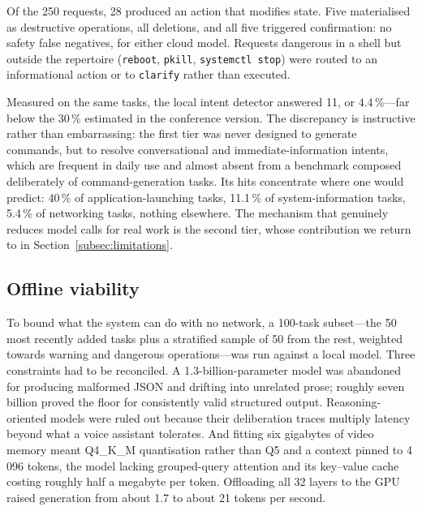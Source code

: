 \documentclass[10pt,a4paper]{article}
\begin{document}
Of the 250 requests, 28 produced an action that modifies state. Five materialised as destructive operations, all deletions, and all five triggered confirmation: no safety false negatives, for either cloud model. Requests dangerous in a shell but outside the repertoire (\texttt{reboot}, \texttt{pkill}, \texttt{systemctl stop}) were routed to an informational action or to \texttt{clarify} rather than executed.

Measured on the same tasks, the local intent detector answered 11, or 4.4\,\%---far below the 30\,\% estimated in the conference version. The discrepancy is instructive rather than embarrassing: the first tier was never designed to generate commands, but to resolve conversational and immediate-information intents, which are frequent in daily use and almost absent from a benchmark composed deliberately of command-generation tasks. Its hits concentrate where one would predict: 40\,\% of application-launching tasks, 11.1\,\% of system-information tasks, 5.4\,\% of networking tasks, nothing elsewhere. The mechanism that genuinely reduces model calls for real work is the second tier, whose contribution we return to in Section~\ref{subsec:limitations}.

\subsection{Offline viability}
\label{subsec:res-offline}

To bound what the system can do with no network, a 100-task subset---the 50 most recently added tasks plus a stratified sample of 50 from the rest, weighted towards warning and dangerous operations---was run against a local model. Three constraints had to be reconciled. A 1.3-billion-parameter model was abandoned for producing malformed JSON and drifting into unrelated prose; roughly seven billion proved the floor for consistently valid structured output. Reasoning-oriented models were ruled out because their deliberation traces multiply latency beyond what a voice assistant tolerates. And fitting six gigabytes of video memory meant Q4\_K\_M quantisation rather than Q5 and a context pinned to 4\,096 tokens, the model lacking grouped-query attention and its key--value cache costing roughly half a megabyte per token. Offloading all 32 layers to the GPU raised generation from about 1.7 to about 21 tokens per second.
\end{document}
